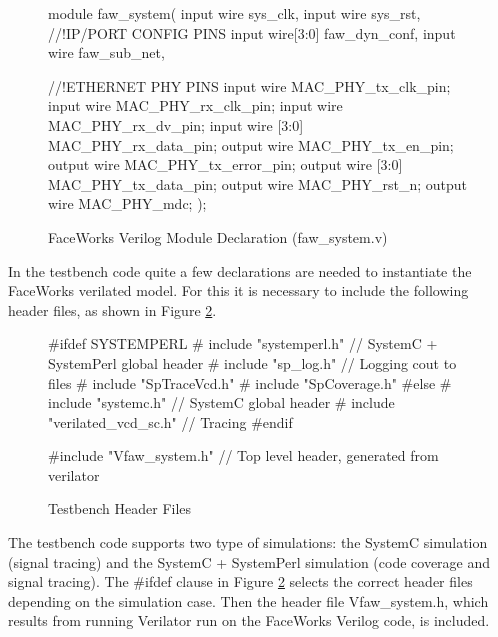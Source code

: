 \documentclass[defaultstyle,10pt,master,Helvetica]{thesis}
\begin{document}
\begin{figure}[h]
\begin{boxedverbatim}
module faw_system(
        input wire sys_clk,
        input wire sys_rst,
        //!IP/PORT CONFIG PINS
        input wire[3:0] faw_dyn_conf,
        input wire faw_sub_net,
   
        //!ETHERNET PHY PINS  
        input wire MAC_PHY_tx_clk_pin;
        input wire MAC_PHY_rx_clk_pin;
        input wire MAC_PHY_rx_dv_pin;
        input wire [3:0] MAC_PHY_rx_data_pin;
        output wire MAC_PHY_tx_en_pin;
        output wire MAC_PHY_tx_error_pin;
        output wire [3:0] MAC_PHY_tx_data_pin;
        output wire MAC_PHY_rst_n;
        output wire MAC_PHY_mdc;
);

\end{boxedverbatim}
\caption{FaceWorks Verilog Module Declaration (faw\_system.v)}
\label{chp4:fawsystem}
\end{figure}

In the testbench code quite a few declarations are needed to instantiate the FaceWorks verilated model. For this it is necessary to include the following header files, as shown in Figure \ref{chp4:fawheader}.

\begin{figure}[h]
\begin{boxedverbatim}
#ifdef SYSTEMPERL
# include "systemperl.h"	// SystemC + SystemPerl global header
# include "sp_log.h"		// Logging cout to files
# include "SpTraceVcd.h"
# include "SpCoverage.h"
#else
# include "systemc.h"		// SystemC global header
# include "verilated_vcd_sc.h"	// Tracing
#endif

#include "Vfaw_system.h" // Top level header, generated from verilator

\end{boxedverbatim}
\caption{Testbench Header Files}
\label{chp4:fawheader}
\end{figure}

The testbench code supports two type of simulations: the SystemC simulation (signal tracing) and the SystemC + SystemPerl simulation (code coverage and signal tracing). The \#ifdef clause in Figure \ref{chp4:fawheader} selects the correct header files depending on the simulation case. Then the header file Vfaw\_system.h, which results from running Verilator run on the FaceWorks Verilog code, is included.
\end{document}

